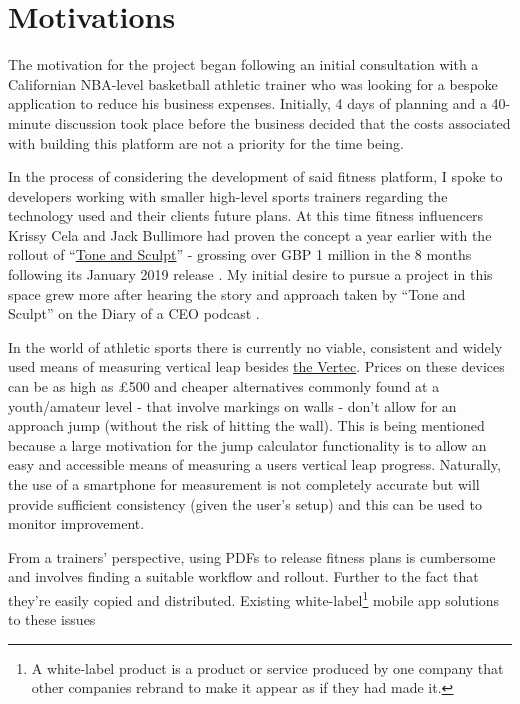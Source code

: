 \section{Motivations}
\label{sec:intro_motivation}
The motivation for the project began following an initial consultation with a Californian
NBA-level basketball athletic trainer who was looking for a bespoke application
to reduce his business expenses. Initially, 4 days of planning and a 40-minute discussion
took place before the business decided that the costs associated with building this platform
are not a priority for the time being.
\par
In the process of considering the development of said fitness platform, I spoke to developers
working with smaller high-level sports trainers regarding the technology used and their clients
future plans. At this time fitness influencers Krissy Cela and Jack Bullimore had proven the concept
a year earlier with the rollout of ``\href{https://toneandsculpt.app/}{Tone and Sculpt}'' -
grossing over GBP 1 million in the 8 months following its January 2019 release \cite{tonensculpt}.
My initial desire to pursue a project in this space grew more after hearing the story and approach taken by
``Tone and Sculpt'' on the Diary of a CEO podcast \cite{krissy-podcast}.
\par
In the world of athletic sports there is currently no viable, consistent and widely used means
of measuring vertical leap besides
\href{https://www.topendsports.com/testing/products/vertical-jump/vertec.htm}{the Vertec}.
Prices on these devices can be as high as £500 and cheaper alternatives commonly found
at a youth/amateur level - that involve markings on walls - don't allow for an approach
jump (without the risk of hitting the wall). This is being mentioned because a large motivation for the jump calculator
functionality is to allow an easy and accessible means of measuring a users vertical leap
progress. Naturally, the use of a smartphone for measurement is not completely accurate but
will provide sufficient consistency (given the user's setup) and this can be used to monitor
improvement.
\par
From a trainers' perspective,  using PDFs to release fitness plans is cumbersome
and involves finding a suitable workflow and rollout. Further to the fact that they're
easily copied and distributed. Existing white-label\footnote{A white-label product is a product or service produced by one company that other companies rebrand to make it appear as if they had made it.}
 mobile app solutions to these issues
